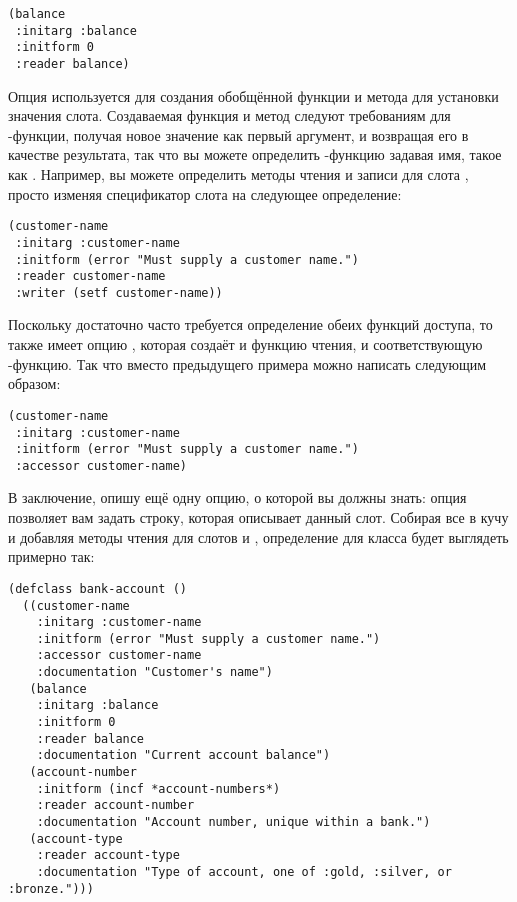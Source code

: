 \begin{lstlisting}
(balance
 :initarg :balance
 :initform 0
 :reader balance)
\end{lstlisting}

Опция  используется для создания обобщённой функции и метода для установки
значения слота.  Создаваемая функция и метод следуют требованиям для -функции,
получая новое значение как первый аргумент, и возвращая его в качестве результата, так что
вы можете определить -функцию задавая имя, такое как .  Например, вы можете определить методы чтения и записи для слота
, просто изменяя спецификатор слота на следующее определение:

\begin{lstlisting}
(customer-name
 :initarg :customer-name
 :initform (error "Must supply a customer name.")
 :reader customer-name
 :writer (setf customer-name))
\end{lstlisting}

Поскольку достаточно часто требуется определение обеих функций доступа, то 
также имеет опцию , которая создаёт и функцию чтения, и соответствующую
-функцию.  Так что вместо предыдущего примера можно написать следующим образом:

\begin{lstlisting}
(customer-name
 :initarg :customer-name
 :initform (error "Must supply a customer name.")
 :accessor customer-name)
\end{lstlisting}

В заключение, опишу ещё одну опцию, о которой вы должны знать: опция 
позволяет вам задать строку, которая описывает данный слот.  Собирая все в кучу и добавляя
методы чтения для слотов  и , определение
 для класса  будет выглядеть примерно так:

\begin{lstlisting}
(defclass bank-account ()
  ((customer-name
    :initarg :customer-name
    :initform (error "Must supply a customer name.")
    :accessor customer-name
    :documentation "Customer's name")
   (balance
    :initarg :balance
    :initform 0
    :reader balance
    :documentation "Current account balance")
   (account-number
    :initform (incf *account-numbers*)
    :reader account-number
    :documentation "Account number, unique within a bank.")
   (account-type
    :reader account-type
    :documentation "Type of account, one of :gold, :silver, or :bronze.")))
\end{lstlisting}

